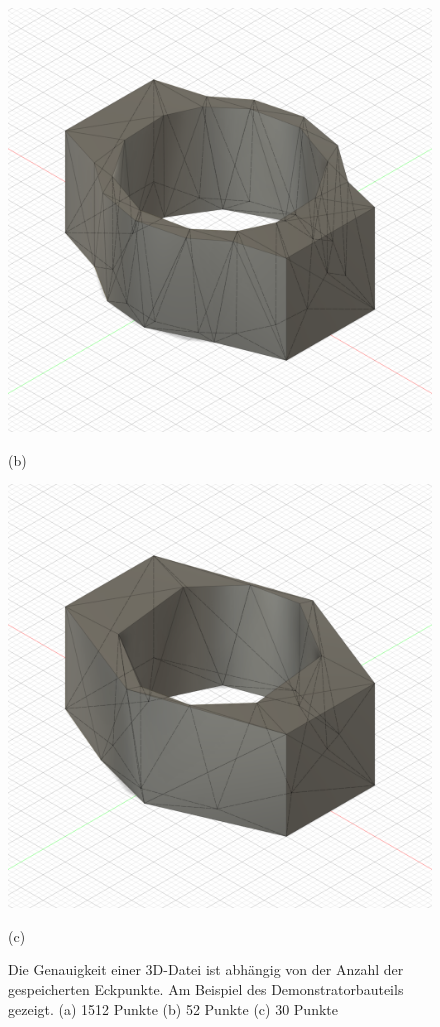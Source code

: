 \begin{figure}[H]
\begin{minipage}{0.32\textwidth}
        \includegraphics[width=\linewidth]{images/image_demo_medium.PNG} %
        \caption*{(b)}
    \end{minipage}\hfill
    \begin{minipage}{0.32\textwidth}
        \centering
        \includegraphics[width=\linewidth]{images/image_demo_low.PNG} %
        \caption*{(c)}
    \end{minipage}\hfill

    \caption{Die Genauigkeit einer 3D-Datei ist abhängig von der Anzahl der gespeicherten
    Eckpunkte. Am Beispiel des Demonstratorbauteils gezeigt. (a) 1512 Punkte
    (b) 52 Punkte (c) 30 Punkte}
    \label{fig:3d_design}
\end{figure}

